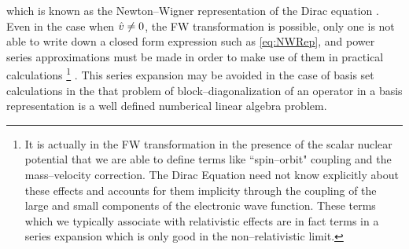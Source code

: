 which is known as the Newton--Wigner representation of the Dirac equation \cite{Wigner49_400}. Even in the case
when $\hat{v} \neq 0$, the FW transformation is possible, only one is not able to write down a closed
form expression such as \cref{eq:NWRep}, and power series approximations must be made in order to make
use of them in practical calculations 
\footnote{It is actually in the FW transformation in the presence of the scalar nuclear  potential 
that we are able to define terms like ``spin--orbit" coupling and the mass--velocity correction. The Dirac Equation need not know explicitly 
about these effects and accounts for them implicity through the coupling of the large and small components
of the electronic wave function. These terms which we typically associate with relativistic effects are in fact
terms in a series expansion which is only good in the non--relativistic limit.}
\cite{Wolf15_book}. 
This series expansion may be avoided in the case of basis set calculations 
in the that problem of block--diagonalization of an operator in a basis representation is a well defined
numberical linear algebra problem.

